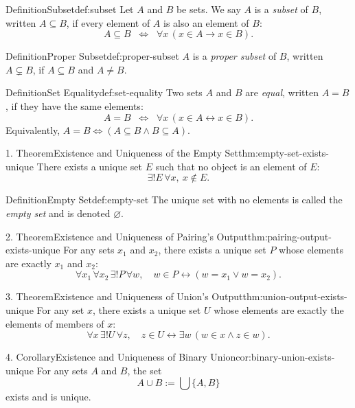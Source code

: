 \documentclass[11pt]{article}
\begin{document}
\begin{studyblock}{Definition}{Subset}{def:subset}
Let $A$ and $B$ be sets. We say $A$ is a \emph{subset} of $B$, written
$A \subseteq B$, if every element of $A$ is also an element of $B$:
\[
A \subseteq B \;\;\Longleftrightarrow\;\; \forall x \, (x \in A \rightarrow x \in B).
\]
\end{studyblock}
\begin{studyblock}{Definition}{Proper Subset}{def:proper-subset}
$A$ is a \emph{proper subset} of $B$, written $A \subsetneq B$, if
$A \subseteq B$ and $A \neq B$.
\end{studyblock}
\begin{studyblock}{Definition}{Set Equality}{def:set-equality}
Two sets $A$ and $B$ are \emph{equal}, written $A = B$, if they have the same
elements:
\[
A = B \;\;\Longleftrightarrow\;\; \forall x \, (x \in A \leftrightarrow x \in B).
\]
Equivalently, $A = B \iff (A \subseteq B \land B \subseteq A)$.
\end{studyblock}
\begin{studyblock}{1. Theorem}{Existence and Uniqueness of the Empty Set}{thm:empty-set-exists-unique}
There exists a unique set $E$ such that no object is an element of $E$:
\[
  \exists! E\,\forall x,\ x\notin E.
\]
\end{studyblock}
\begin{studyblock}{Definition}{Empty Set}{def:empty-set}
The unique set with no elements is called the \emph{empty set} and is denoted
$\varnothing$.
\end{studyblock}
\begin{studyblock}{2. Theorem}{Existence and Uniqueness of Pairing's Output}{thm:pairing-output-exists-unique}
For any sets $x_1$ and $x_2$, there exists a unique set $P$ whose elements are
exactly $x_1$ and $x_2$:
\[
  \forall x_1\,\forall x_2\,\exists! P\,\forall w,\quad
  w\in P\leftrightarrow (w=x_1\vee w=x_2).
\]
\end{studyblock}
\begin{studyblock}{3. Theorem}{Existence and Uniqueness of Union's Output}{thm:union-output-exists-unique}
For any set $x$, there exists a unique set $U$ whose elements are exactly the
elements of members of $x$:
\[
  \forall x\,\exists! U\,\forall z,\quad
  z\in U\leftrightarrow \exists w\,(w\in x\wedge z\in w).
\]
\end{studyblock}
\begin{studyblock}{4. Corollary}{Existence and Uniqueness of Binary Union}{cor:binary-union-exists-unique}
For any sets $A$ and $B$, the set
\[
  A\cup B:=\bigcup\{A,B\}
\]
exists and is unique.
\end{studyblock}
\end{document}
